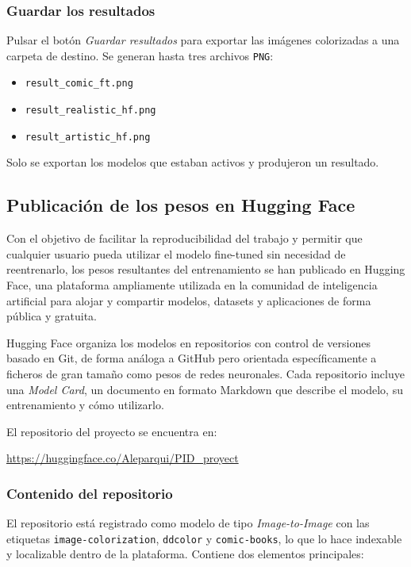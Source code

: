 \documentclass[a4paper]{article}
\begin{document}
\subsubsection{Guardar los resultados}

Pulsar el botón \textit{Guardar resultados} para exportar las imágenes colorizadas a una carpeta de destino. Se generan hasta tres archivos \texttt{PNG}:

\begin{itemize}
  \item \texttt{result\_comic\_ft.png}
  \item \texttt{result\_realistic\_hf.png}
  \item \texttt{result\_artistic\_hf.png}
\end{itemize}

Solo se exportan los modelos que estaban activos y produjeron un resultado.

\subsection{Publicación de los pesos en Hugging Face}

Con el objetivo de facilitar la reproducibilidad del trabajo y permitir que cualquier usuario pueda utilizar el modelo fine-tuned sin necesidad de reentrenarlo, los pesos resultantes del entrenamiento se han publicado en Hugging Face, una plataforma ampliamente utilizada en la comunidad de inteligencia artificial para alojar y compartir modelos, datasets y aplicaciones de forma pública y gratuita.

Hugging Face organiza los modelos en repositorios con control de versiones basado en Git, de forma análoga a GitHub pero orientada específicamente a ficheros de gran tamaño como pesos de redes neuronales. Cada repositorio incluye una \textit{Model Card}, un documento en formato Markdown que describe el modelo, su entrenamiento y cómo utilizarlo.

El repositorio del proyecto se encuentra en:

\begin{center}
  \url{https://huggingface.co/Aleparqui/PID_proyect}
\end{center}

\subsubsection{Contenido del repositorio}

El repositorio está registrado como modelo de tipo \textit{Image-to-Image} con las etiquetas \texttt{image-colorization}, \texttt{ddcolor} y \texttt{comic-books}, lo que lo hace indexable y localizable dentro de la plataforma. Contiene dos elementos principales:
\end{document}
